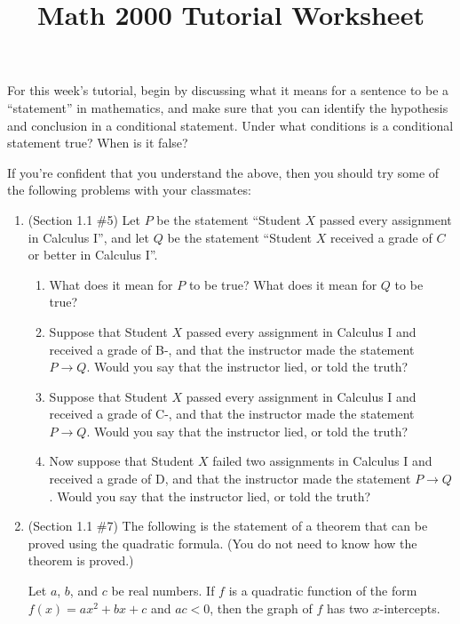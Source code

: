 \documentclass[letterpaper,12pt]{article}
\title{Math 2000 Tutorial Worksheet}
\begin{document}
\maketitle

 For this week's tutorial, begin by discussing what it means for a sentence to be a ``statement'' in mathematics, and make sure that you can identify the hypothesis and conclusion in a conditional statement. Under what conditions is a conditional statement true? When is it false?

 If you're confident that you understand the above, then you should try some of the following problems with your classmates:
\begin{enumerate}
 \item (Section 1.1 \#5) Let $P$ be the statement ``Student $X$ passed every assignment in Calculus I'', and let $Q$ be the statement ``Student $X$ received a grade of $C$ or better in Calculus I''.
\begin{enumerate}
 \item What does it mean for $P$ to be true? What does it mean for $Q$ to be true?
\item Suppose that Student $X$ passed every assignment in Calculus I and received a grade of B-, and that the instructor made the statement $P\to Q$. Would you say that the instructor lied, or told the truth?
\item Suppose that Student $X$ passed every assignment in Calculus I and received a grade of C-, and that the instructor made the statement $P\to Q$. Would you say that the instructor lied, or told the truth?
\item Now suppose that Student $X$ failed two assignments in Calculus I and received a grade of D, and that the instructor made the statement $P\to Q$. Would you say that the instructor lied, or told the truth?
\end{enumerate}
\item (Section 1.1 \#7) The following is the statement of a theorem that can be proved using the quadratic formula. (You do not need to know how the theorem is proved.)

 Let $a$, $b$, and $c$ be real numbers. If $f$ is a quadratic function of the form $f(x)=ax^2+bx+c$ and $ac<0$, then the graph of $f$ has two $x$-intercepts.


\end{enumerate}
\end{document}

